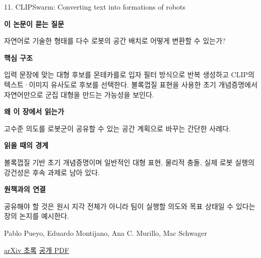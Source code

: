 \documentclass[11pt,openany]{book}
\begin{document}
\begin{termcard}{11. CLIPSwarm: Converting text into formations of robots}

\par

\medskip

{\sffamily\bfseries\color{deepblue} 이 논문이 묻는 질문}\par

자연어로 기술한 형태를 다수 로봇의 공간 배치로 어떻게 변환할 수 있는가?

\smallskip

{\sffamily\bfseries\color{deepblue} 핵심 구조}\par

입력 문장에 맞는 대형 후보를 몬테카를로 입자 필터 방식으로 반복 생성하고 CLIP의 텍스트·이미지 유사도로 후보를 선택한다. 볼록껍질 표현을 사용한 초기 개념증명에서 자연어만으로 군집 대형을 만드는 가능성을 보인다.

\smallskip

{\sffamily\bfseries\color{deepblue} 왜 이 장에서 읽는가}\par

고수준 의도를 로봇군이 공유할 수 있는 공간 계획으로 바꾸는 간단한 사례다.

\smallskip

{\sffamily\bfseries\color{coral} 읽을 때의 경계}\par

볼록껍질 기반 초기 개념증명이며 일반적인 대형 표현, 물리적 충돌, 실제 로봇 실행의 강건성은 후속 과제로 남아 있다.

\smallskip

{\sffamily\bfseries\color{teal} 원책과의 연결}\par

공유해야 할 것은 원시 지각 전체가 아니라 팀이 실행할 의도와 목표 상태일 수 있다는 장의 논지를 예시한다.

\medskip

{\footnotesize\color{muted} Pablo Pueyo, Eduardo Montijano, Ana C. Murillo, Mac Schwager\par

\href{https://arxiv.org/abs/2311.11047}{arXiv 초록} \quad \href{https://arxiv.org/pdf/2311.11047}{공개 PDF}\par}

\end{termcard}
\end{document}
